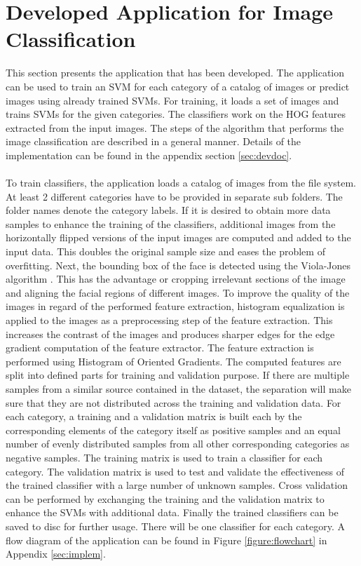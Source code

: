 
\section{Developed Application for Image Classification}\label{sec:application}

This section presents the application that has been developed. The application can be used to train an SVM for each category of a catalog of images or predict images using already trained SVMs. For training, it loads a set of images and trains SVMs for the given categories. The classifiers work on the HOG features extracted from the input images. The steps of the algorithm that performs the image classification are described in a general manner. Details of the implementation can be found in the appendix section \ref{sec:devdoc}.
\\
\\
To train classifiers, the application loads a catalog of images from the file system. At least 2 different categories have to be provided in separate sub folders. The folder names denote the category labels. If it is desired to obtain more data samples to enhance the training of the classifiers, additional images from the horizontally flipped versions of the input images are computed and added to the input data. This doubles the original sample size and eases the problem of overfitting. Next, the bounding box of the face is detected using the Viola-Jones algorithm \cite{Viola01}. This has the advantage or cropping irrelevant sections of the image and aligning the facial regions of different images.  To improve the quality of the images in regard of the performed feature extraction, histogram equalization is applied to the images as a preprocessing step of the feature extraction. This increases the contrast of the images and produces sharper edges for the edge gradient computation of the feature extractor. The feature extraction is performed using Histogram of Oriented Gradients. The computed features are split into defined parts for training and validation purpose. If there are multiple samples from a similar source contained in the dataset, the separation will make sure that they are not distributed across the training and validation data. For each category, a training and a validation matrix is built each by the corresponding elements of the category itself as positive samples and an equal number of evenly distributed samples from all other corresponding categories as negative samples. The training matrix is used to train a classifier for each category. The validation matrix is used to test and validate the effectiveness of the trained classifier with a large number of unknown samples. Cross validation can be performed by exchanging the training and the validation matrix to enhance the SVMs with additional data. Finally the trained classifiers can be saved to disc for further usage. There will be one classifier for each category. A flow diagram of the application can be found in Figure \ref{figure:flowchart} in Appendix \ref{sec:implem}.
